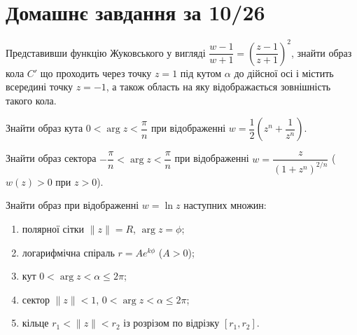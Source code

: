 \setcounter{section}{10}

\section{Домашнє завдання за 10/26}

\begin{problem}[Волковиський, 2.121.2]
    Представивши функцію Жуковського у вигляді $\dfrac{w-1}{w+1}=\left(\dfrac{z-1}{z+1}\right)^2$, знайти образ кола $C'$ що проходить через точку $z=1$ під кутом $\alpha$ до дійсної осі і містить всередині точку $z=-1$, а також область на яку відображається зовнішність такого кола.
\end{problem}

\begin{solution}
    
\end{solution}

\begin{problem}[Волковиський, 2.126]
    Знайти образ кута $0 < \arg z < \dfrac{\pi}{n}$ при відображенні $w = \dfrac12 \left(z^n + \dfrac{1}{z^n}\right)$.
\end{problem}

\begin{solution}

\end{solution}

\begin{problem}[Волковиський, 2.127]
    Знайти образ сектора $-\dfrac{\pi}{n} < \arg z < \dfrac{\pi}{n}$ при відображенні $w =\dfrac{z}{(1+z^n)^{2/n}}$ ($w(z) > 0$ при $z > 0$).
\end{problem}

\begin{solution}

\end{solution}

\begin{problem}[Волковиський, 2.148]
    Знайти образ при відображенні $w = \ln z$ наступних множин:
    \begin{enumerate}
        \item полярної сітки $\|z\|=R$, $\arg z = \phi$;
        \item логарифмічна спіраль $r = Ae^{k\phi}$ ($A > 0$);
        \item кут $0 < \arg z < \alpha \le 2 \pi$;
        \item сектор $\|z\| < 1$, $0 < \arg z < \alpha \le 2 \pi$;
        \item кільце $r_1 < \|z\| < r_2$ із розрізом по відрізку $[r_1,r_2]$.
    \end{enumerate}
\end{problem}

